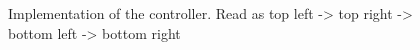 \documentclass{article}
\begin{document}
\begin{figure}[ht]
\begin{subfigure}{.5\textwidth}
    \end{subfigure}
    \caption{Implementation of the controller. Read as top left -> top right -> 
    bottom left -> bottom right}
    \label{controllerPseudo}
\end{figure}
\newpage



\end{document}

